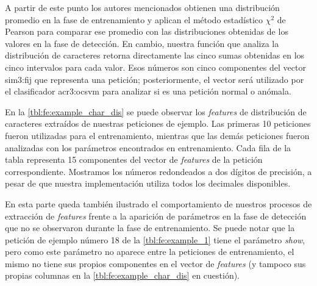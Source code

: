 A partir de este punto los autores mencionados obtienen una distribución
promedio en la fase de entrenamiento y aplican el método estadístico
$\chi^{2}$ de Pearson \citep{encyMathChi2} para comparar ese promedio
con las distribuciones obtenidas de los valores en la fase de detección.
En cambio, nuestra función que analiza la distribución de caracteres
retorna directamente las cinco sumas obtenidas en los cinco intervalos
para cada valor. Esos números son cinco componentes del vector \gls{sim3:fij}
que representa una petición; posteriormente, el vector será utilizado
por el clasificador \gls{acr3:ocsvm} para analizar si es una petición
normal o anómala.

En la \autoref{tbl:fe:example_char_dis} se puede observar los \textit{features}
de distribución de caracteres extraídos de nuestras peticiones de ejemplo.
Las primeras 10 peticiones fueron utilizadas para el entrenamiento,
mientras que las demás peticiones fueron analizadas con los parámetros
encontrados en entrenamiento.
Cada fila de la tabla representa 15 componentes del vector de \textit{features}
de la petición correspondiente. Mostramos los números redondeados a dos
dígitos de precisión, a pesar de que nuestra implementación utiliza todos
los decimales disponibles.

En esta parte queda también ilustrado el comportamiento de nuestros
procesos de extracción de \textit{features} frente a la aparición de
parámetros en la fase de detección que no se observaron durante la fase
de entrenamiento. Se puede notar que la petición de ejemplo número 18
de la \autoref{tbl:fe:example_1} tiene el parámetro \textit{show}, pero
como este parámetro no aparece entre la peticiones de entrenamiento, el
mismo no tiene sus propios componentes en el vector de \textit{features}
(y tampoco sus propias columnas en la \autoref{tbl:fe:example_char_dis}
en cuestión).

